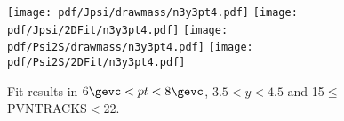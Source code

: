\begin{figure}[H]
\begin{center}
\texttt{[image: pdf/Jpsi/drawmass/n3y3pt4.pdf]}
\texttt{[image: pdf/Jpsi/2DFit/n3y3pt4.pdf]}
\vspace*{-0.5cm}
\texttt{[image: pdf/Psi2S/drawmass/n3y3pt4.pdf]}
\texttt{[image: pdf/Psi2S/2DFit/n3y3pt4.pdf]}
\vspace*{-0.5cm}
\end{center}
\caption{Fit results in $6\gevc<pt<8\gevc$, $3.5<y<4.5$ and 15$\leq$PVNTRACKS$<$22.}
\label{Fitn3y3pt4}
\end{figure}
